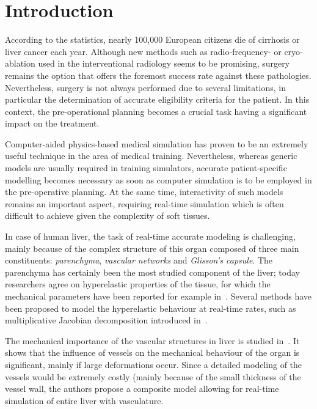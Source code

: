 \documentclass{llncs}
\begin{document}
\section{Introduction} 
According to the statistics, nearly 100,000 European citizens die of cirrhosis or liver cancer each year. 
Although new methods such as radio-frequency- or cryo-ablation used in the interventional radiology 
seems to be promising, surgery remains the option that offers the foremost success rate against these pathologies. 
Nevertheless, surgery is not always performed due to several limitations, in particular the determination 
of accurate eligibility criteria for the patient. 
In this context, the pre-operational planning becomes a crucial task having a significant impact on the treatment. 

Computer-aided physics-based medical simulation has proven to be an extremely useful technique in the area of medical training. 
Nevertheless, whereas generic models are usually required in training simulators, accurate patient-specific modelling
becomes necessary as soon as computer simulation is to be employed in the pre-operative planning. At the same time, 
interactivity of such models remains an important aspect, requiring real-time simulation which is often difficult to 
achieve given the complexity of soft tissues. 

In case of human liver, the task of real-time accurate modeling is challenging, mainly because of the complex structure 
of this organ composed of three main constituents: \emph{parenchyma}, \emph{vascular networks} and \emph{Glisson's capsule}.
The parenchyma has certainly been the most studied component of the liver; today researchers agree on hyperelastic 
properties of the tissue, for which the mechanical parameters have been reported for example in~\cite{Kerdok2006,Gao2009}. 
Several methods have been proposed to model the hyperelastic behaviour at real-time rates, such as multiplicative Jacobian decomposition
introduced in~\cite{Marchesseau2010}.

The mechanical importance of the vascular structures in liver is studied in~\cite{Peterlik2012}. It shows that the 
influence of vessels on the mechanical behaviour of the organ is significant, mainly if large deformations occur. 
Since a detailed modeling of the vessels would be extremely costly (mainly because of the small thickness of the vessel wall, 
the authors propose a composite model allowing for real-time simulation of entire liver with vasculature.
\end{document}
